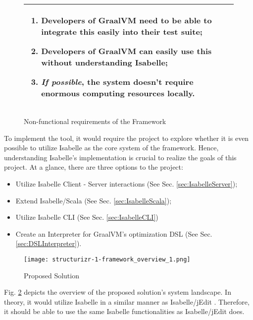 \begin{figure}[h]
      \begin{tabular}{|L{0.95\textwidth}|}
            \hline
            \begin{enumerate}
                  \item Developers of GraalVM need to be able to integrate this easily into their test suite;
                  \item Developers of GraalVM can easily use this without understanding Isabelle;
                  \item \emph{If possible}, the system doesn't require enormous computing resources locally.
            \end{enumerate} \\
            \hline
      \end{tabular}
      \caption{Non-functional requirements of the Framework}
      \label{fig:requirements}
\end{figure}

To implement the tool, it would require the project to explore whether it is even possible to utilize Isabelle as the core system of the framework. 
Hence, understanding Isabelle's implementation is crucial to realize the goals of this project. At a glance, there are three options 
to the project:

\begin{itemize}
    \item Utilize Isabelle Client - Server interactions (See Sec. \ref{sec:IsabelleServer});
    \item Extend Isabelle/Scala (See Sec. \ref{sec:IsabelleScala});
    \item Utilize Isabelle CLI (See Sec. \ref{sec:IsabelleCLI})
    \item Create an Interpreter for GraalVM's optimization DSL (See Sec. \ref{sec:DSLInterpreter}).
\end{itemize}

\begin{figure}[h]
      \centering
      \texttt{[image: structurizr-1-framework\_overview\_1.png]}
      \caption{Proposed Solution}
      \label{fig:SystemLandscape}
\end{figure}

Fig. \ref{fig:SystemLandscape} depicts the overview of the proposed solution's system landscape. In theory, it would utilize Isabelle in a similar 
manner as Isabelle/jEdit \cite{isabelleSystem}. Therefore, it should be able to use the same Isabelle functionalities as Isabelle/jEdit does.

